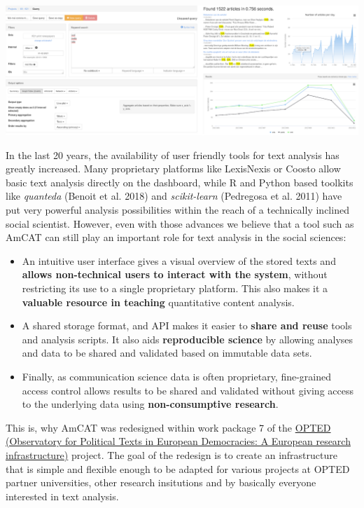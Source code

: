 \documentclass[
  letterpaper,
  DIV=11,
  numbers=noendperiod]{scrreprt}
\providecommand{\tightlist}{%
  \setlength{\itemsep}{0pt}\setlength{\parskip}{0pt}}\usepackage{longtable,booktabs,array}
\begin{document}
\includegraphics{media/amcat3.5.png}

In the last 20 years, the availability of user friendly tools for text
analysis has greatly increased. Many proprietary platforms like
LexisNexis or Coosto allow basic text analysis directly on the
dashboard, while R and Python based toolkits like \emph{quanteda}
(Benoit et al. 2018) and \emph{scikit-learn} (Pedregosa et al. 2011)
have put very powerful analysis possibilities within the reach of a
technically inclined social scientist. However, even with those advances
we believe that a tool such as AmCAT can still play an important role
for text analysis in the social sciences:

\begin{itemize}
\tightlist
\item
  An intuitive user interface gives a visual overview of the stored
  texts and \textbf{allows non-technical users to interact with the
  system}, without restricting its use to a single proprietary platform.
  This also makes it a \textbf{valuable resource in teaching}
  quantitative content analysis.
\item
  A shared storage format, and API makes it easier to \textbf{share and
  reuse} tools and analysis scripts. It also aids \textbf{reproducible
  science} by allowing analyses and data to be shared and validated
  based on immutable data sets.
\item
  Finally, as communication science data is often proprietary,
  fine-grained access control allows results to be shared and validated
  without giving access to the underlying data using
  \textbf{non-consumptive research}.
\end{itemize}

This is, why AmCAT was redesigned within work package 7 of the
\href{https://opted.eu/team/wp7-pre-processing-storage-and-data-sharing/}{OPTED
(Observatory for Political Texts in European Democracies: A European
research infrastructure)} project. The goal of the redesign is to create
an infrastructure that is simple and flexible enough to be adapted for
various projects at OPTED partner universities, other research
insitutions and by basically everyone interested in text analysis.
\end{document}
